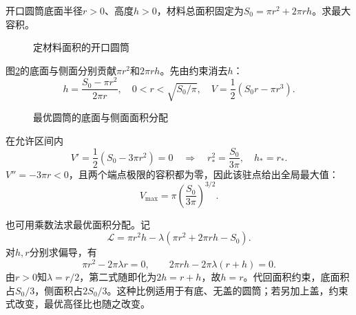 \begin{example}[定表面积开口圆筒的容量]\label{ex:hw2-6}

开口圆筒底面半径$r>0$、高度$h>0$，材料总面积固定为$S_0=\pi r^2+2\pi rh$。求最大容积。

\end{example}


\begin{figure}[H]\centering
{}
\caption{定材料面积的开口圆筒}\label{fig:hw2-6-q}
\end{figure}

\begin{solution}
图\ref{fig:hw2-6-s}的底面与侧面分别贡献$\pi r^2$和$2\pi rh$。先由约束消去$h$：
\[
 h=\frac{S_0-\pi r^2}{2\pi r},\quad
 0<r<\sqrt{S_0/\pi},\quad V=\frac12(S_0r-\pi r^3).
\]

\begin{figure}[H]\centering
{}
\caption{最优圆筒的底面与侧面面积分配}\label{fig:hw2-6-s}
\end{figure}

在允许区间内
\[
 V'=\frac12(S_0-3\pi r^2)=0
 \quad\Longrightarrow\quad r_*^2=\frac{S_0}{3\pi},\quad h_*=r_*.
\]
$V''=-3\pi r<0$，且两个端点极限的容积都为零，因此该驻点给出全局最大值：
\[
 \boxed{V_{\max}=\pi\left(\frac{S_0}{3\pi}\right)^{3/2}}.
\]


也可用乘数法求最优面积分配。记
\[
 \mathcal L=\pi r^2h-\lambda(\pi r^2+2\pi rh-S_0).
\]
对$h,r$分别求偏导，有
\[
 \pi r^2-2\pi\lambda r=0,\qquad
 2\pi rh-2\pi\lambda(r+h)=0.
\]
由$r>0$知$\lambda=r/2$，第二式随即化为$2h=r+h$，故$h=r$。代回面积约束，底面积占$S_0/3$，侧面积占$2S_0/3$。这种比例适用于有底、无盖的圆筒；若另加上盖，约束式改变，最优高径比也随之改变。

\end{solution}



